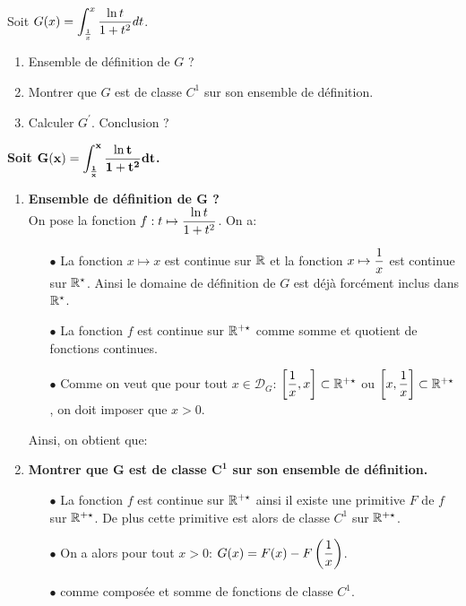 \documentclass[a4paper, 11pt,reqno]{article}
\begin{document}
\begin{exercice}  \;
	Soit $G(x)=\displaystyle \int_{\frac{1}{x}}^{x} \displaystyle\frac{\ln{t}}{1+t^2} dt$.
	\begin{enumerate}
		\item Ensemble de d\'efinition de $G$ ?
		\item Montrer que $G$ est de classe $C^1$ sur son ensemble de d\'efinition.
		\item Calculer $G^{\prime}$. Conclusion ?
	\end{enumerate}
\end{exercice}
\begin{correction}\;
	\noindent \textbf{Soit $\mathbf{G(x)= \displaystyle \int_{\frac{1}{x}}^{x} \displaystyle\frac{\ln{t}}{1+t^2} dt}$.}
	\begin{enumerate}
		\item \textbf{Ensemble de d\'efinition de $\mathbf{G}$ ?}\\
		      \noindent On pose la fonction $f: t\mapsto \displaystyle\frac{\ln{t}}{1+t^2}$. On a:
		      \begin{itemize}
			      \item[$\bullet$] La fonction $x\mapsto x$ est continue sur $\mathbb{R}$ et la fonction $x\mapsto \displaystyle\frac{1}{x}$ est continue sur $\mathbb{R}^{\star}$. Ainsi le domaine de d\'efinition de $G$ est d\'ej\`{a} forc\'ement inclus dans $\mathbb{R}^{\star}$.
			      \item[$\bullet$] La fonction $f$ est continue sur $\mathbb{R}^{+\star}$ comme somme et quotient de fonctions continues.
			      \item[$\bullet$] Comme on veut que pour tout $x\in\mathcal{D}_G$: $\left\lbrack \displaystyle\frac{1}{x},x\right\rbrack\subset \mathbb{R}^{+\star}$ ou $\left\lbrack x,  \displaystyle\frac{1}{x} \right\rbrack\subset \mathbb{R}^{+\star}$, on doit imposer que $x>0$.
		      \end{itemize}
		      Ainsi, on obtient que: 
		\item \textbf{Montrer que $\mathbf{G}$ est de classe $\mathbf{C^1}$ sur son ensemble de d\'efinition.}
		      \begin{itemize}
			      \item[$\bullet$] La fonction $f$ est continue sur $\mathbb{R}^{+\star}$ ainsi il existe une primitive $F$ de $f$ sur $\mathbb{R}^{+\star}$. De plus cette primitive est alors de classe $C^1$ sur $\mathbb{R}^{+\star}$.
			      \item[$\bullet$] On a alors pour tout $x>0$: $G(x)=F(x)-F\left(  \displaystyle\frac{1}{x} \right)$.
			      \item[$\bullet$]  comme compos\'ee et somme de fonctions de classe $C^1$.

\end{itemize}
\end{enumerate}
\end{correction}
\end{document}
